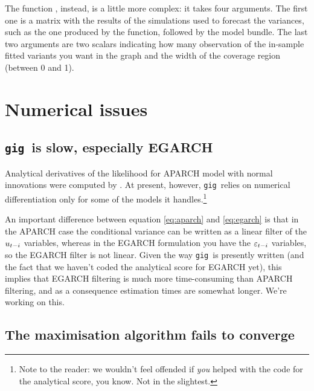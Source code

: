 \documentclass[a4paper,11pt]{article}
\newcommand{\dtk}[1]{\texttt{\detokenize{#1}}}
\newcommand{\stdu}{\ensuremath \varepsilon}
\newcommand{\uhat}{\ensuremath u}
\newcommand{\gig}{\texttt{gig}}
\begin{document}
The function \dtk{gig_vfgraph}, instead, is a little more complex: it
takes four arguments. The first one is a matrix with the results of
the simulations used to forecast the variances, such as the one
produced by the \dtk{gig_var_fcast} function, followed by the model
bundle. The last two arguments are two scalars indicating how many
observation of the in-sample fitted variants you want in the graph and
the width of the coverage region (between 0 and 1).

\section{Numerical issues}
\label{sec:numerical}

\subsection{\gig\ is slow, especially EGARCH}
Analytical derivatives of the likelihood for APARCH model with normal
innovations were computed by \cite{Laurent}. At present, however,
\gig\ relies on numerical differentiation only for some of the models
it handles.\footnote{Note to the reader: we wouldn't feel offended if
  \emph{you} helped with the code for the analytical score, you
  know. Not in the slightest.}

An important difference between equation \eqref{eq:aparch} and
\eqref{eq:egarch} is that in the APARCH case the conditional variance
can be written as a linear filter of the $\uhat_{t-i}$ variables,
whereas in the EGARCH formulation you have the $\stdu_{t-i}$
variables, so the EGARCH filter is not linear. Given the way \gig\ is
presently written (and the fact that we haven't coded the analytical
score for EGARCH yet), this implies that EGARCH filtering is much more
time-consuming than APARCH filtering, and as a consequence estimation
times are somewhat longer. We're working on this.

\subsection{The maximisation algorithm fails to converge}
\end{document}
